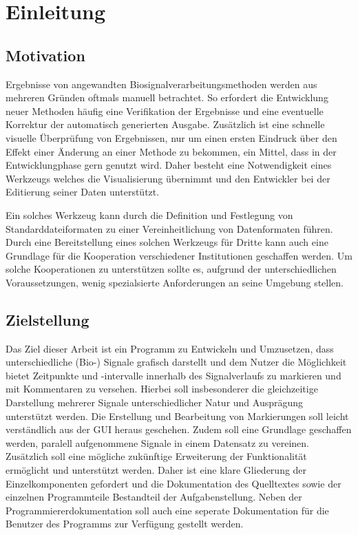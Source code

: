 \chapter{Einleitung}

\section{Motivation}

Ergebnisse von angewandten Biosignalverarbeitungsmethoden werden aus mehreren Gr\"unden oftmals manuell betrachtet.
So erfordert die Entwicklung neuer Methoden h\"aufig eine Verifikation der Ergebnisse und eine eventuelle Korrektur der automatisch generierten Ausgabe.
Zus\"atzlich ist eine schnelle visuelle \"Uberpr\"ufung von Ergebnissen, nur um einen ersten Eindruck \"uber den Effekt einer \"Anderung an einer Methode zu bekommen, ein Mittel, dass in der Entwicklungphase gern genutzt wird.
Daher besteht eine Notwendigkeit eines Werkzeugs welches die Visualisierung \"ubernimmt und den Entwickler bei der Editierung seiner Daten unterst\"utzt.

Ein solches Werkzeug kann durch die Definition und Festlegung von Standarddateiformaten zu einer Vereinheitlichung von Datenformaten f\"uhren.
Durch eine Bereitstellung eines solchen Werkzeugs f\"ur Dritte kann auch eine Grundlage f\"ur die Kooperation verschiedener Institutionen geschaffen werden.
Um solche Kooperationen zu unterst\"utzen sollte es, aufgrund der unterschiedlichen Voraussetzungen, wenig spezialsierte Anforderungen an seine Umgebung stellen.

\section{Zielstellung}

Das Ziel dieser Arbeit ist ein Programm zu Entwickeln und Umzusetzen, dass unterschiedliche (Bio-) Signale grafisch darstellt und dem Nutzer die M\"oglichkeit bietet Zeitpunkte und -intervalle innerhalb des Signalverlaufs zu markieren und mit Kommentaren zu versehen.
Hierbei soll insbesonderer die gleichzeitige Darstellung mehrerer Signale unterschiedlicher Natur und Auspr\"agung unterst\"utzt werden.
Die Erstellung und Bearbeitung von Markierungen soll leicht verst\"andlich aus der \ac{GUI} heraus geschehen.
Zudem soll eine Grundlage geschaffen werden, paralell aufgenommene Signale in einem Datensatz zu vereinen.
Zus\"atzlich soll eine m\"ogliche zuk\"unftige Erweiterung der Funktionalit\"at erm\"oglicht und unterst\"utzt werden.
Daher ist eine klare Gliederung der Einzelkomponenten gefordert und die Dokumentation des Quelltextes sowie der einzelnen Programmteile Bestandteil der Aufgabenstellung.
Neben der Programmiererdokumentation soll auch eine seperate Dokumentation f\"ur die Benutzer des Programms zur Verf\"ugung gestellt werden.

